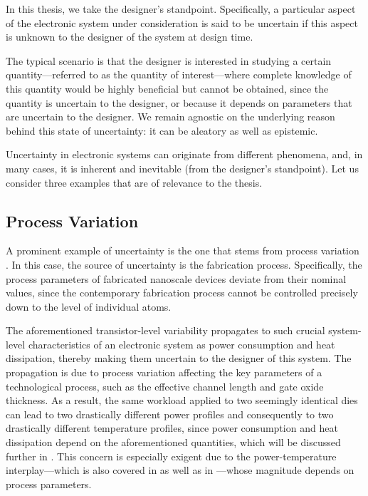 In this thesis, we take the designer's standpoint. Specifically, a particular
aspect of the electronic system under consideration is said to be uncertain if
this aspect is unknown to the designer of the system at design time.

The typical scenario is that the designer is interested in studying a certain
quantity---referred to as the quantity of interest---where complete knowledge of
this quantity would be highly beneficial but cannot be obtained, since the
quantity \perse is uncertain to the designer, or because it depends on
parameters that are uncertain to the designer. We remain agnostic on the
underlying reason behind this state of uncertainty: it can be aleatory as well
as epistemic.

Uncertainty in electronic systems can originate from different phenomena, and,
in many cases, it is inherent and inevitable (from the designer's standpoint).
Let us consider three examples that are of relevance to the thesis.

\subsection{Process Variation}

A prominent example of uncertainty is the one that stems from process variation
\cite{chandrakasan2000, srivastava2010}. In this case, the source of uncertainty
is the fabrication process. Specifically, the process parameters of fabricated
nanoscale devices deviate from their nominal values, since the contemporary
fabrication process cannot be controlled precisely down to the level of
individual atoms.

The aforementioned transistor-level variability propagates to such crucial
system-level characteristics of an electronic system as power consumption and
heat dissipation, thereby making them uncertain to the designer of this system.
The propagation is due to process variation affecting the key parameters of a
technological process, such as the effective channel length and gate oxide
thickness. As a result, the same workload applied to two seemingly identical
dies can lead to two drastically different power profiles and consequently to
two drastically different temperature profiles, since power consumption and heat
dissipation depend on the aforementioned quantities, which will be discussed
further in . This concern is especially exigent due to the
power-temperature interplay---which is also covered in  as
well as in ---whose magnitude depends on process
parameters.

